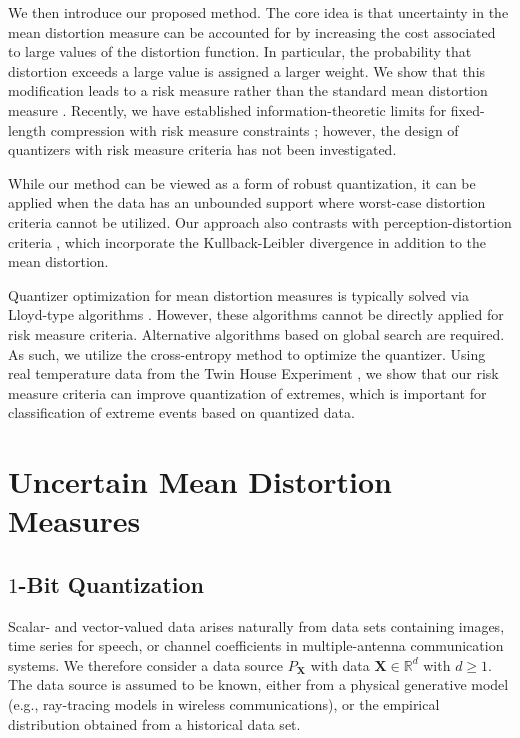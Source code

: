 \documentclass[conference]{IEEEtran}
\begin{document}
We then introduce our proposed method. The core idea is that uncertainty in the mean distortion measure can be accounted for by increasing the cost associated to large values of the distortion function. In particular, the probability that distortion exceeds a large value is assigned a larger weight. We show that this modification leads to a risk measure rather than the standard mean distortion measure \cite{Yaari1987dual,Serada2010distortion}. Recently, we have established information-theoretic limits for fixed-length compression with risk measure constraints \cite{Egan2025risk}; however, the design of quantizers with risk measure criteria has not been investigated. 

While our method can be viewed as a form of robust quantization, it can be applied when the data has an unbounded support where worst-case distortion criteria \cite{Gersho2012vector} cannot be utilized. Our approach also contrasts with perception-distortion criteria \cite{Blau2019rethinking}, which incorporate the Kullback-Leibler divergence in addition to the mean distortion. %

Quantizer optimization for mean distortion measures is typically solved via Lloyd-type algorithms \cite{Gersho2012vector}. However, these algorithms cannot be directly applied for risk measure criteria. Alternative algorithms based on global search are required. As such, we utilize the cross-entropy method \cite{Botev2013cross} to optimize the quantizer. Using real temperature data from the Twin House Experiment \cite{Kersken2020}, we show that our risk measure criteria can improve quantization of extremes, which is important for classification of extreme events based on quantized data.  

\section{Uncertain Mean Distortion Measures}

\subsection{$1$-Bit Quantization}

Scalar- and vector-valued data arises naturally from data sets containing images, time series for speech, or channel coefficients in multiple-antenna communication systems. We therefore consider a data source $P_{\mathbf{X}}$ with data $\mathbf{X} \in \mathbb{R}^d$ with $d \geq 1$. The data source is assumed to be known, either from a physical generative model (e.g., ray-tracing models in wireless communications), or the empirical distribution obtained from a historical data set. 
\end{document}
